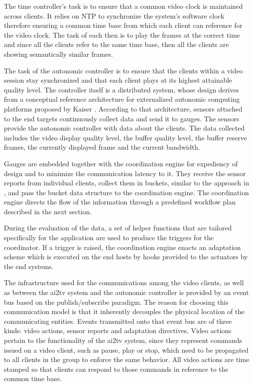 \documentclass{sig-alternate}
\begin{document}
The time controller's task is to ensure that a common video clock is
maintained across clients.  It relies on NTP \cite{NTP} to synchronize
the system's software clock therefore ensuring a common time base from
which each client can reference for the video clock.  The task of each
then is to play the frames at the correct time and since all the
clients refer to the same time base, then all the clients are showing
semantically similar frames.

The task of the autonomic controller is to ensure that the clients
within a video session stay synchronized and that each client plays at
its highest attainable quality level.  The controller itself is a
distributed system, whose design derives from a conceptual reference
architecture for externalized autonomic computing platforms proposed
by Kaiser \cite{refarch}.
%
%
According to that architecture, sensors attached to the end targets
continuously collect data and send it to gauges.  The sensors provide
the autonomic controller with data about the clients.  The data
collected includes the video display quality level, the buffer quality
level, the buffer reserve frames, the currently displayed frame and
the current bandwidth.  

Gauges are embedded together with the coordination engine for
expediency of design and to minimize the communication latency to it.
They receive the sensor reports from individual clients, collect them
in buckets, similar to the approach in \cite{MIMAZE}, and pass the
bucket data structure to the coordination engine.  The coordination
engine directs the flow of the information through a predefined
workflow plan described in the next section.

During the evaluation of the data, a set of helper functions that are
tailored specifically for the application are used to produce the
triggers for the coordinator.  If a trigger is raised, the
coordination engine enacts an adaptation scheme which is executed on
the end hosts by hooks provided to the actuators by the end systems.

The infrastructure used for the communications among the video
clients, as well as between the ai2tv system and the autonomic
controller is provided by an event bus based on the publish/subscribe
paradigm.  The reason for choosing this communication model is that it
inherently decouples the physical location of the communicating
entities.  Events transmitted onto that event bus are of three kinds:
video actions, sensor reports and adaptation directives.  Video
actions pertain to the functionality of the ai2tv system, since they
represent commands issued on a video client, such as pause, play or
stop, which need to be propagated to all clients in the group to
enforce the same behavior.  All video actions are time stamped so
that clients can respond to those commands in reference to the common
time base.
\end{document}
